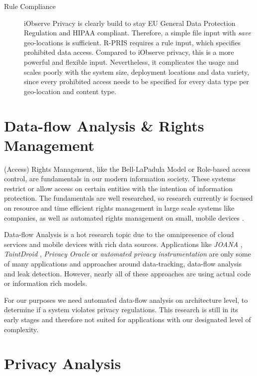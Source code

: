\begin{description}
	\item[Rule Compliance] iObserve Privacy is clearly build to stay EU General Data Protection Regulation and HIPAA compliant. Therefore, a simple file input with \textit{save} geo-locations is sufficient. R-PRIS requires a rule input, which specifies prohibited data access. Compared to iObserve privacy, this is a more powerful and flexible input. Nevertheless, it complicates the usage and scales poorly with the system size, deployment locations and data variety, since every prohibited access needs to be specified for every data type per geo-location and content type.
\end{description}



\section{Data-flow Analysis \& Rights Management}
\label{sec:RelatedWork:dataflow}

(Access) Rights Management, like the Bell-LaPadula Model or Role-based access control, are fundamentals in our modern information society. These systems restrict or allow access on certain entities with the intention of information protection. The fundamentals are well researched, so research currently is focused on resource and time efficient rights management in large scale systems like companies, as well as automated rights management on small, mobile devices \cite{Dinger.2008}.

Data-flow Analysis is a hot research topic due to the omnipresence of cloud services and mobile devices with rich data sources. Applications like \textit{JOANA} \cite{Snelting.2014}, \textit{TaintDroid} \cite{Enck.2014}, \textit{Privacy Oracle}  \cite{Jung.2008} or \textit{automated privacy instrumentation} \cite{Suh.2004} are only some of many applications and approaches around data-tracking, data-flow analysis and leak detection. However, nearly all of these approaches are using actual code or information rich models.

For our purposes we need automated data-flow analysis on architecture level, to determine if a system violates privacy regulations. This research is still in its early stages and therefore not suited for applications with our designated level of complexity.


\section{Privacy Analysis}
\label{sec:RelatedWork:privacy_check}

